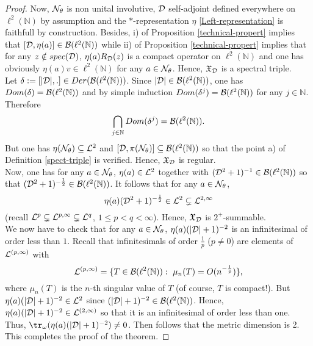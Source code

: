 \documentclass[a4paper]{jpconf}
\numberwithin{equation}{section}
\theoremstyle{nonumberplain}
\newtheorem{proof}{Proof}
\begin{document}
\begin{proof}
\noindent Now, ${\cal{N}}_\theta$ is non unital involutive, ${\cal{D}}$ self-adjoint defined everywhere on $\ell^2(\mathbb{N})$ by assumption and the $*$-representation $\eta$ \eqref{Left-representation} is faithfull by construction. Besides, i) of Proposition \ref{technical-propert} implies that $[{\cal{D}},\eta(a)]\in{\cal{B}}(\ell^2(\mathbb{N}))$ while ii) of Proposition \ref{technical-propert} implies that for any $z\notin spec({\cal{D}})$, $\eta(a)R_{\cal{D}}(z)$ is a compact operator on $\ell^2(\mathbb{N})$ and one has obviously $\eta(a)v\in\ell^2(\mathbb{N})$ for any $a\in{\cal{N}}_\theta$. Hence, $\mathfrak{X}_{{\cal{D}}}$ is a spectral triple.\\
Let $\delta:=[|{\cal{D}}|,.]\in Der({\cal{B}}(\ell^2(\mathbb{N}))) $. Since $|{\cal{D}}|\in{\cal{B}}(\ell^2(\mathbb{N}))$, one has $Dom(\delta)={\cal{B}}(\ell^2(\mathbb{N}))$ and by simple induction $Dom(\delta^j)={\cal{B}}(\ell^2(\mathbb{N}))$ for any $j\in\mathbb{N}$. Therefore
\begin{equation}
\bigcap_{j\in\mathbb{N}}Dom(\delta^j)={\cal{B}}(\ell^2(\mathbb{N}))\label{rhs-regular}.
\end{equation}
But one has $\eta({\cal{N}}_\theta)\subseteq{\cal{L}}^2$ and $[{\cal{D}},\pi({\cal{N}}_\theta)]\subseteq{\cal{B}}(\ell^2(\mathbb{N}))$ so that the point a) of Definition \ref{spect-triple} is verified. Hence, $\mathfrak{X}_{{\cal{D}}}$ is regular.\\
Now, one has for any $a\in{\cal{N}}_\theta$, $\eta(a)\in{\cal{L}}^2$ together with $({\cal{D}}^2+1)^{-1}\in{\cal{B}}(\ell^2(\mathbb{N}))$ so that $({\cal{D}}^2+1)^{-\frac{1}{2}}\in{\cal{B}}(\ell^2(\mathbb{N}))$. It follows that for any $a\in{\cal{N}}_\theta$,
\begin{equation}
\eta(a)({\cal{D}}^2+1)^{-\frac{1}{2}}\in{\cal{L}}^2\subsetneq{\cal{L}}^{2,\infty}
\end{equation}
(recall ${\cal{L}}^p\subsetneq{\cal{L}}^{p,\infty}\subsetneq{\cal{L}}^q$, $1\le 
p<q<\infty$). Hence, $\mathfrak{X}_{{\cal{D}}}$ is $2^+$-summable.\\
We now have to check that for any $a\in{\cal{N}}_\theta$, $\eta(a)(|{\cal{D}}|+1)^{-2}$ is an infinitesimal of order less than $1$. Recall that infinitesimals of order $\frac{1}{p}$ ($p\ne0$) are elements of ${\cal{L}}^{(p,\infty)}$ with
\begin{equation}
{\cal{L}}^{(p,\infty)}=\{T\in{\cal{B}}(\ell^2(\mathbb{N})):\ \mu_n(T)=O(n^{-\frac{1}{p}}) \},\label{ideal-infinitesim}
\end{equation}
where $\mu_n(T)$ is the $n$-th singular value of $T$ (of course, $T$ is compact!). But $\eta(a)(|{\cal{D}}|+1)^{-2}\in{\cal{L}}^2$ since $(|{\cal{D}}|+1)^{-2}\in{\cal{B}}(\ell^2(\mathbb{N}))$. Hence, $\eta(a)(|{\cal{D}}|+1)^{-2}\in{\cal{L}}^{(2,\infty)}$ so that it is an infinitesimal of order less than one. Thus, $\tr_\omega(\eta(a)(|{\cal{D}}|+1)^{-2})\ne0$. Then follows that the metric dimension is 2. This completes the proof of the theorem.
\end{proof}
\end{document}
